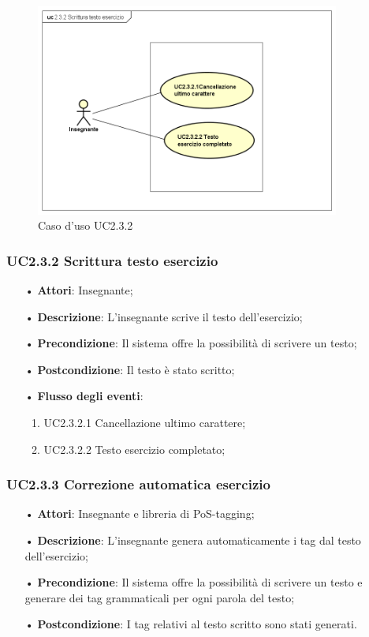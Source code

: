 \begin{figure}[H]
	\centering
	\includegraphics[width=10cm]{img/UC232.png} 
	\caption{Caso d'uso UC2.3.2}
\end{figure}


\subsubsection{UC2.3.2 Scrittura testo esercizio}
\begin{itemize}
	\item[•] \textbf{Attori}: Insegnante;
	\item[•] \textbf{Descrizione}: L'insegnante scrive il testo dell’esercizio;
	\item[•] \textbf{Precondizione}: Il sistema offre la possibilità di scrivere un testo;
	\item[•] \textbf{Postcondizione}: Il testo è stato scritto;
	\item[•] \textbf{Flusso degli eventi}:
	\begin{enumerate}
		\item UC2.3.2.1	Cancellazione ultimo carattere;
		\item UC2.3.2.2	Testo esercizio completato;
	\end{enumerate}
\end{itemize}


\subsubsection{UC2.3.3	Correzione automatica esercizio}
\begin{itemize}
	\item[•] \textbf{Attori}: Insegnante e libreria di PoS-tagging;
	\item[•] \textbf{Descrizione}: L’insegnante genera automaticamente i tag dal testo dell’esercizio;
	\item[•] \textbf{Precondizione}: Il sistema offre la possibilità di scrivere un testo e generare dei tag grammaticali per ogni parola del testo;
	\item[•] \textbf{Postcondizione}: I tag relativi al testo scritto sono stati generati.
\end{itemize}

